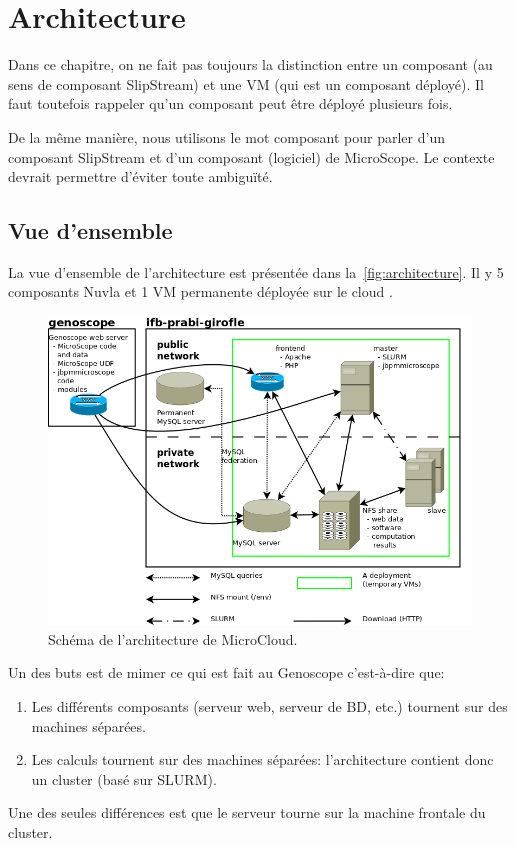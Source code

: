 \chapter{Architecture}

Dans ce chapitre, on ne fait pas toujours la distinction entre un composant (au sens de composant SlipStream)
et une VM (qui est un composant déployé).
Il faut toutefois rappeler qu'un composant peut être déployé plusieurs fois.

De la même manière, nous utilisons le mot \og{} composant \fg{} pour parler d'un composant SlipStream
et d'un composant (logiciel) de MicroScope.
Le contexte devrait permettre d'éviter toute ambiguïté.

\section{Vue d'ensemble}

La vue d'ensemble de l'architecture est présentée dans la~\autoref{fig:architecture}.
Il y 5 composants Nuvla et
1 VM permanente déployée sur le cloud .

\begin{figure}[htp]
    \centering
    \includegraphics[width=\linewidth]{../Logical_Architecture}
    \caption{Schéma de l'architecture de MicroCloud.}
    \label{fig:architecture}
\end{figure}

Un des buts est de mimer ce qui est fait au Genoscope
c'est-à-dire que:
\begin{enumerate}
    \item Les différents composants (serveur web, serveur de BD, etc.) tournent sur des machines séparées.
    \item Les calculs tournent sur des machines séparées: l'architecture contient donc un cluster (basé sur SLURM).
\end{enumerate}
Une des seules différences est que le serveur  tourne
sur la machine frontale du cluster.

